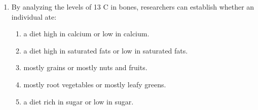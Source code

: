 \documentclass[12pt]{article}
\begin{document}
\begin{enumerate}[label=\arabic*.]
\begin{enumerate}[label=(\alph*)]
    \item both a and b
    \item Clovis
    \item Gravettian
    \item Mousterian
    \item Acheulean
\end{enumerate}
\item By analyzing the levels of 13 C in bones, researchers can establish whether an individual ate:
\begin{enumerate}[label=(\alph*)]
    \item a diet high in calcium or low in calcium.
    \item a diet high in saturated fats or low in saturated fats.
    \item mostly grains or mostly nuts and fruits.
    \item mostly root vegetables or mostly leafy greens.
    \item a diet rich in sugar or low in sugar.
\end{enumerate}
\end{enumerate}
\end{document}
